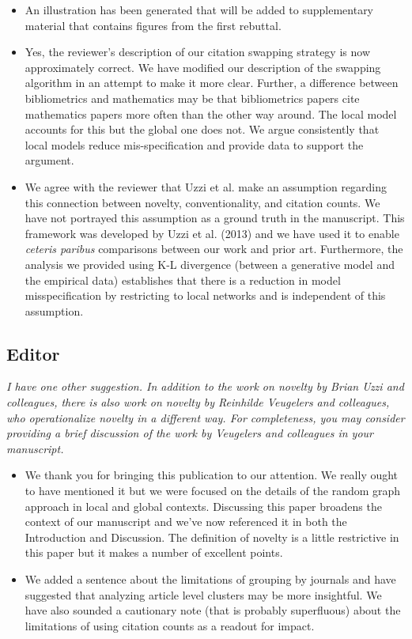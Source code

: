 \documentclass[11pt, oneside]{article}   	%
\begin{document}
\begin{itemize}
\item An illustration has been generated that will be added to supplementary material that contains figures from the first rebuttal.
\item Yes, the reviewer's description of our citation swapping strategy is now approximately correct. We have modified our description of the swapping algorithm in an attempt to make it more clear. Further, a difference between bibliometrics and mathematics may be that bibliometrics papers cite mathematics papers more often than the other way around. The local model accounts for this but the global one does not. We argue consistently that local models reduce mis-specification and provide data to support the argument.
\item We agree with the reviewer that Uzzi et al. make an assumption regarding this connection between novelty, conventionality, and citation counts. We have not portrayed this assumption as a ground truth in the manuscript. This framework was developed by Uzzi et al. (2013) and we have used it to enable \emph{ceteris paribus} comparisons between our work and prior art. Furthermore, the analysis we provided using K-L divergence (between a generative model and the empirical data) establishes that there is a reduction in model misspecification by restricting to local networks and is independent of this assumption.
\end{itemize}

\subsection{Editor}
\emph{I have one other suggestion. In addition to the work on novelty by Brian Uzzi and colleagues, there is also work on novelty by Reinhilde Veugelers and colleagues, who operationalize novelty in a different way. For completeness, you may consider providing a brief discussion of the work by Veugelers and colleagues in your manuscript.}
\begin{itemize}
\item We thank you for bringing this publication to our attention. We really ought to have mentioned it but we were focused on the details of the random graph approach in local and global contexts. Discussing this paper broadens the context of our manuscript and we've now referenced it in both the Introduction and Discussion. The definition of novelty is a little restrictive in this paper but it makes a number of excellent points.
\item We added a sentence about the limitations of grouping by journals and have suggested that analyzing article level clusters may be more insightful. We have also sounded a cautionary note (that is probably superfluous) about the limitations of using citation counts as a readout for impact. \end{itemize}
 
\end{document}
